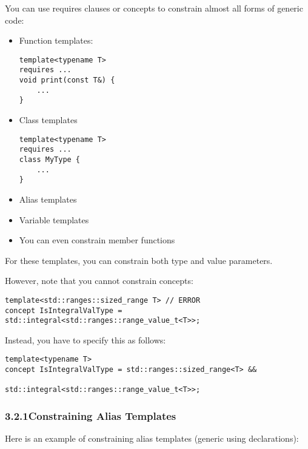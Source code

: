 

You can use requires clauses or concepts to constrain almost all forms of generic code:

\begin{itemize}
\item
Function templates:
\begin{lstlisting}[style=styleCXX]
template<typename T>
requires ...
void print(const T&) {
	...
}
\end{lstlisting}

\item
Class templates
\begin{lstlisting}[style=styleCXX]
template<typename T>
requires ...
class MyType {
	...
}
\end{lstlisting}

\item
Alias templates

\item
Variable templates

\item
You can even constrain member functions
\end{itemize}

For these templates, you can constrain both type and value parameters.

However, note that you cannot constrain concepts:

\begin{lstlisting}[style=styleCXX]
template<std::ranges::sized_range T> // ERROR
concept IsIntegralValType = std::integral<std::ranges::range_value_t<T>>;
\end{lstlisting}

Instead, you have to specify this as follows:

\begin{lstlisting}[style=styleCXX]
template<typename T>
concept IsIntegralValType = std::ranges::sized_range<T> &&
							std::integral<std::ranges::range_value_t<T>>;
\end{lstlisting}


\subsubsection*{ 3.2.1\hspace{0.2cm}Constraining Alias Templates}

Here is an example of constraining alias templates (generic using declarations):

